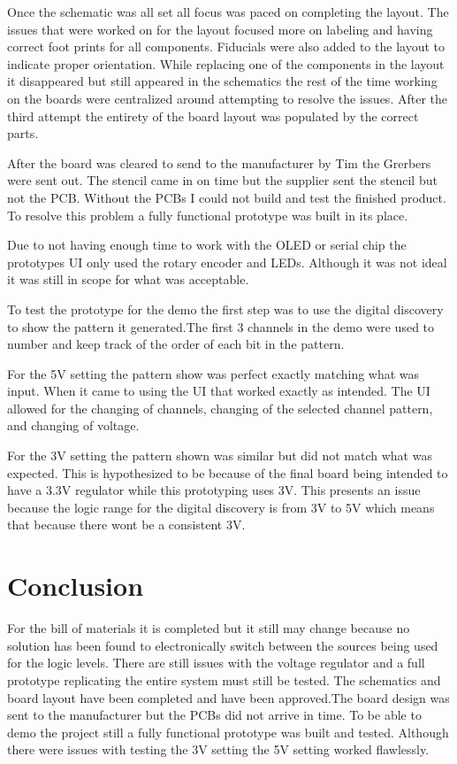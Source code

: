 \documentclass[12pt]{article}
\begin{document}
    \par Once the schematic was all set all focus was paced on completing the layout. The issues that were worked on for the layout focused more on labeling and having correct foot prints for all components. Fiducials were also added to the layout to indicate proper orientation. While replacing one of the components in the layout it disappeared but still appeared in the schematics the rest of the time working on the boards were centralized around attempting to resolve the issues. After the third attempt the entirety of the board layout was populated by the correct parts.  
    \par After the board was cleared to send to the manufacturer by Tim the Grerbers were sent out. The stencil came in on time but the supplier sent the stencil but not the PCB. Without the PCBs I could not build and test the finished product. To resolve this problem a fully functional prototype was built in its place.
    \par Due to not having enough time to work with the OLED or serial chip the prototypes UI only used the rotary encoder and LEDs. Although it was not ideal it was still in scope for what was acceptable.
    \par To test the prototype for the demo the first step was to use the digital discovery to show the pattern it generated.The first 3 channels in the demo were used to number and keep track of the order of each bit in the pattern.
    \par For the 5V setting the pattern show was perfect exactly matching what was input. When it came to using the UI that worked exactly as intended. The UI allowed for the changing of channels, changing of the selected channel pattern, and changing of voltage.
    \par For the 3V setting the pattern shown was similar but did not match what was expected. This is hypothesized to be because of the final board being intended to have a 3.3V regulator while this prototyping uses 3V. This presents an issue because the logic range for the digital discovery is from 3V to 5V which means that because there wont be a consistent 3V.

    \newpage

    \section{Conclusion}
    For the bill of materials it is completed but it still may change because no solution has been found to electronically switch between the sources being used for the logic levels. There are still issues with the voltage regulator and a full prototype replicating the entire system must still be tested. The schematics and board layout have been completed and have been approved.The board design was sent to the manufacturer but the PCBs did not arrive in time. To be able to demo the project still a fully functional prototype was built and tested. Although there were issues with testing the 3V setting the 5V setting worked flawlessly.
\end{document}
